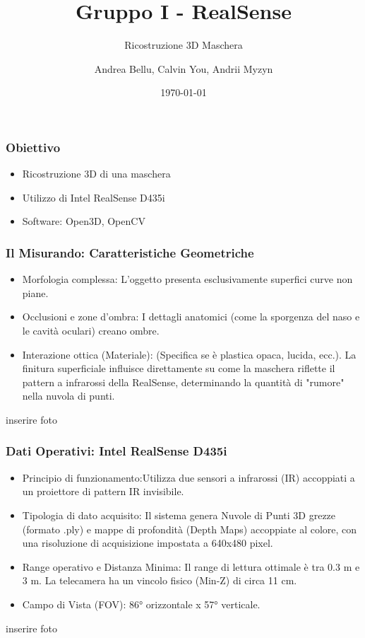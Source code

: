 \documentclass[aspectratio=169]{beamer}
\title{Gruppo I - RealSense}
\subtitle{Ricostruzione 3D Maschera}
\author{Andrea Bellu, Calvin You, Andrii Myzyn}
\date{\today}
\begin{document}
\begin{frame}

    \titlepage

\end{frame}



\begin{frame}

    \frametitle{Obiettivo}

    \begin{itemize}

        \item Ricostruzione 3D di una maschera

        \item Utilizzo di Intel RealSense D435i

        \item Software: Open3D, OpenCV

    \end{itemize}

\end{frame}

\begin{frame}
    \frametitle{Il Misurando: Caratteristiche Geometriche}

    \begin{itemize}
        \item Morfologia complessa: L'oggetto presenta esclusivamente superfici curve non piane.
        \item Occlusioni e zone d'ombra: I dettagli anatomici (come la sporgenza del naso e le cavità oculari) creano ombre. 
        \item Interazione ottica (Materiale): (Specifica se è plastica opaca, lucida, ecc.). La finitura superficiale influisce direttamente su come la maschera riflette il pattern a infrarossi della RealSense, determinando la quantità di "rumore" nella nuvola di punti.
    \end{itemize}

    inserire foto

\end{frame}

\begin{frame}
    \frametitle{Dati Operativi: Intel RealSense D435i}

    \begin{itemize}
        \item Principio di funzionamento:Utilizza due sensori a infrarossi (IR) accoppiati a un proiettore di pattern IR invisibile.
        \item Tipologia di dato acquisito: Il sistema genera Nuvole di Punti 3D grezze (formato .ply) e mappe di profondità (Depth Maps) accoppiate al colore, con una risoluzione di acquisizione impostata a 640x480 pixel.
        \item Range operativo e Distanza Minima: Il range di lettura ottimale è tra 0.3 m e 3 m. La telecamera ha un vincolo fisico (Min-Z) di circa 11 cm.
        \item Campo di Vista (FOV): 86° orizzontale x 57° verticale. 
    \end{itemize}
    inserire foto 
\end{frame}
\end{document}
